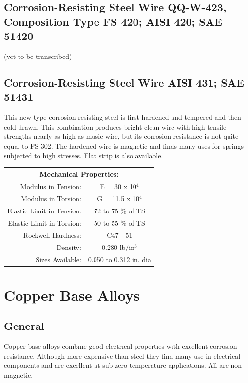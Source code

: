 \documentclass[10pt]{article}
\begin{document}
\subsection{Corrosion-Resisting Steel Wire QQ-W-423, Composition Type FS 420; AISI 420; SAE 51420} %
(yet to be transcribed)

\subsection{Corrosion-Resisting Steel Wire AISI 431; SAE 51431} %
This new type corrosion resisting steel is first hardened and tempered and then cold drawn. 
This combination produces bright clean wire with high tensile strengths nearly as high as music wire, but its corrosion resistance is not quite equal to FS 302. 
The hardened wire is magnetic and finds many uses for springs subjected to high stresses. 
Flat strip is also available.

\begin{center}
\begin{tabular}{ r c }
\multicolumn{2}{c}{Mechanical Properties:} \\
\hline
Modulus in Tension: & E = 30 x 10$^4$ \\  
Modulus in Torsion: & G = 11.5 x 10$^4$ \\
Elastic Limit in Tension: & 72 to 75 \% of TS \\  
Elastic Limit in Torsion: & 50 to 55 \% of TS \\
Rockwell Hardness: & C47 - 51 \\
Density: & 0.280 lb/in$^3$ \\
Sizes Available: & 0.050 to 0.312 in. dia \\
\hline
\end{tabular}
\end{center}

\clearpage
\section{Copper Base Alloys} %
\subsection{General} %
Copper-base alloys combine good electrical properties with excellent corrosion resistance. 
Although more expensive than steel they find many use in electrical components and are excellent at sub zero temperature applications. 
All are non-magnetic.
\end{document}
